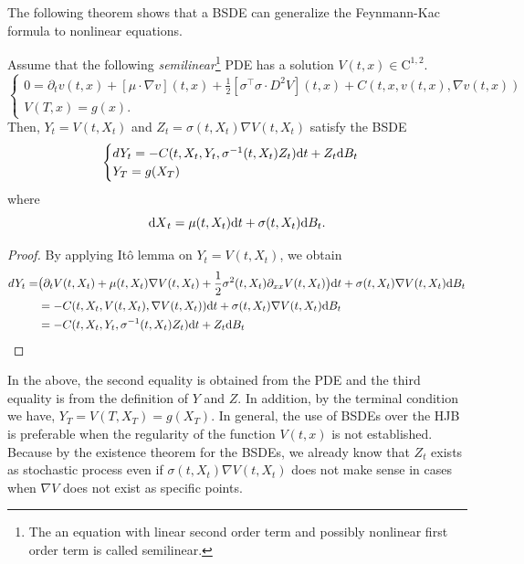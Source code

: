 \documentclass[11pt]{book}
\newcommand{\dd}{\text{\normalfont d}}
\newcommand{\dt}{\text{\normalfont d}t}
\newcommand{\dX}{\text{\normalfont d}X}
\begin{document}
The following theorem shows that a BSDE can generalize the Feynmann-Kac formula to nonlinear equations.
\begin{thm}\label{thm:Markov_BSDE}
Assume that the following \emph{semilinear}\footnote{The an equation with linear second order term and possibly nonlinear first order term is called semilinear.} PDE has a solution $V(t,x)\in\mathrm{C}^{1,2}$.
\begin{equation}\label{eqn:semilinear_PDE}
\begin{cases}
0=\partial_{t}v(t,x)+[\mu\cdot{\nabla}v](t,x)+\frac12[{\sigma^\intercal\sigma\cdot}D^2V](t,x)+C(t,x,v(t,x),\nabla v(t,x))\\
V(T,x)=g(x).
\end{cases}		
\end{equation}
Then, $Y_t=V(t,X_t)$ and  $Z_t=\sigma(t,X_t)\nabla V(t,X_t)$ satisfy the BSDE
\begin{equation}\label{eqn:Markov_BSDE}
\begin{cases}
dY_t=- C(t,X_t,Y_t,\sigma^{-1}(t,X_t)Z_t){{\dt}}+Z_t{\dd}B_t\\
Y_T=g(X_T)
\end{cases}
\end{equation}
where 
\begin{equation}
{\dX}_t=\mu(t,X_t){{\dt}}+\sigma(t,X_t){\dd}B_t.
\end{equation}
\end{thm}
\begin{proof}
By applying It\^o lemma on $Y_t=V(t,X_t)$, we obtain
\begin{equation}
\begin{split}
dY_t=&\big(\partial_{t}V(t,X_t)+\mu(t,X_t)\nabla V(t,X_t)+\frac12{\sigma^2(t,X_t)}\partial_{xx}V(t,X_t)\big){{\dt}}+\sigma(t,X_t)\nabla V(t,X_t){\dd}B_t\\
&=-C(t,X_t,V(t,X_t),\nabla V(t,X_t)){{\dt}}+\sigma(t,X_t)\nabla V(t,X_t){\dd}B_t\\
&=- C(t,X_t,Y_t,\sigma^{-1}(t,X_t)Z_t){{\dt}}+Z_t{\dd}B_t
\end{split}
\end{equation}
\end{proof}

In the above, the second equality is obtained from the PDE and the third equality is from the definition of $Y$ and $Z$. In addition, by the terminal condition we have, $Y_T=V(T,X_T)=g(X_T)$.
In general, the use of BSDEs over the HJB is  preferable when the regularity of the function $V(t,x)$ is not established. Because by the existence theorem for the BSDEs, we already know that  $Z_t$ exists as stochastic process even if $\sigma(t,X_t)\nabla V(t,X_t)$ does not make sense in cases when $\nabla V$ does not exist as specific points.
\end{document}
